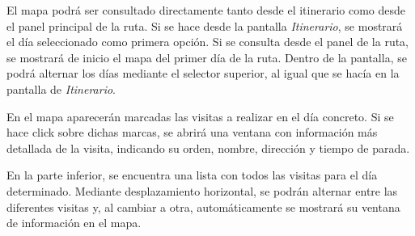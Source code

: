 
El mapa podrá ser consultado directamente tanto desde el itinerario como desde el panel principal de la ruta. Si se hace desde la pantalla \textit{Itinerario}, se mostrará el día seleccionado como primera opción. Si se consulta desde el panel de la ruta, se mostrará de inicio el mapa del primer día de la ruta. Dentro de la pantalla, se podrá alternar los días mediante el selector superior, al igual que se hacía en la pantalla de \textit{Itinerario}.
	
	En el mapa aparecerán marcadas las visitas a realizar en el día concreto. Si se hace click sobre dichas marcas, se abrirá una ventana con información más detallada de la visita, indicando su orden, nombre, dirección y tiempo de parada.
	
	En la parte inferior, se encuentra una lista con todos las visitas para el día determinado. Mediante desplazamiento horizontal, se podrán alternar entre las diferentes visitas y, al cambiar a otra, automáticamente se mostrará su ventana de información en el mapa.
	
